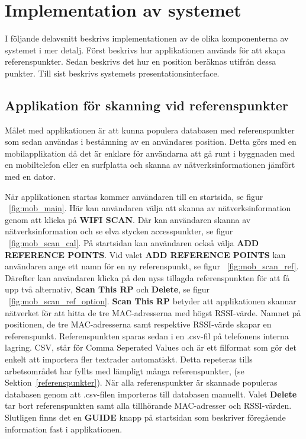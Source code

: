 \documentclass[a4paper,12pt]{article}
\begin{document}
 \section{Implementation av systemet}
 I följande delavsnitt beskrivs implementationen av de olika komponenterna av systemet i mer detalj. Först beskrivs hur applikationen används för att skapa referenspunkter. Sedan beskrivs det hur en position beräknas utifrån dessa punkter. Till sist beskrivs systemets presentationsinterface.

 \subsection{Applikation för skanning vid referenspunkter}
 Målet med applikationen är att kunna populera databasen med referenspunkter som sedan användas i bestämning av en användares position. Detta görs med en mobilapplikation då det är enklare för användarna att gå runt i byggnaden med en mobiltelefon eller en surfplatta och skanna av nätverksinformationen jämfört med en dator.

 När applikationen startas kommer användaren till en startsida, se figur ~\ref{fig:mob_main}. Här kan användaren välja att skanna av nätverksinformation genom att klicka på \textbf{WIFI SCAN}. Där kan användaren skanna av nätverksinformation och se elva stycken accesspunkter, se figur ~\ref{fig:mob_scan_cal}. På startsidan kan användaren också välja \textbf{ADD REFERENCE POINTS}. Vid valet \textbf{ADD REFERENCE POINTS} kan användaren ange ett namn för en ny referenspunkt, se figur ~\ref{fig:mob_scan_ref}. Därefter kan användaren klicka på den nyss tillagda referenspunkten för att få upp två alternativ, \textbf{Scan This RP} och \textbf{Delete}, se figur ~\ref{fig:mob_scan_ref_option}. \textbf{Scan This RP} betyder att applikationen skannar nätverket för att hitta de tre MAC-adresserna med högst RSSI-värde. Namnet på positionen, de tre MAC-adresserna samt respektive RSSI-värde skapar en referenspunkt. Referenspunkten sparas sedan i en .csv-fil på telefonens interna lagring.
 CSV, står för Comma Seperated Values och är ett filformat som gör det enkelt att importera fler textrader automatiskt. Detta repeteras tills arbetsområdet har fyllts med lämpligt många referenspunkter, (se Sektion~\ref{referenspunkter}). När alla referenspunkter är skannade populeras databasen genom att .csv-filen importeras till databasen manuellt. Valet \textbf{Delete} tar bort referenspunkten samt alla tillhörande MAC-adresser och RSSI-värden. Slutligen finns det en \textbf{GUIDE} knapp på startsidan som beskriver föregående information fast i applikationen.
\end{document}
